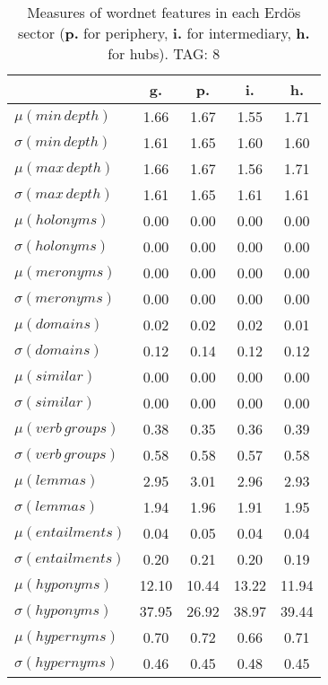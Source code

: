 \begin{table}[h!]
\begin{center}
\begin{tabular}{| l || c | c | c | c |}\hline
 & {\bf g.} & {\bf p.} & {\bf i.} & {\bf h.} \\\hline\hline
$\mu(min\,depth)$ & 1.66  & 1.67  & 1.55  & 1.71 \\
$\sigma(min\,depth)$ & 1.61  & 1.65  & 1.60  & 1.60 \\\hline
$\mu(max\,depth)$ & 1.66  & 1.67  & 1.56  & 1.71 \\
$\sigma(max\,depth)$ & 1.61  & 1.65  & 1.61  & 1.61 \\\hline
$\mu(holonyms)$ & 0.00  & 0.00  & 0.00  & 0.00 \\
$\sigma(holonyms)$ & 0.00  & 0.00  & 0.00  & 0.00 \\\hline
$\mu(meronyms)$ & 0.00  & 0.00  & 0.00  & 0.00 \\
$\sigma(meronyms)$ & 0.00  & 0.00  & 0.00  & 0.00 \\\hline
$\mu(domains)$ & 0.02  & 0.02  & 0.02  & 0.01 \\
$\sigma(domains)$ & 0.12  & 0.14  & 0.12  & 0.12 \\\hline
$\mu(similar)$ & 0.00  & 0.00  & 0.00  & 0.00 \\
$\sigma(similar)$ & 0.00  & 0.00  & 0.00  & 0.00 \\\hline
$\mu(verb\,groups)$ & 0.38  & 0.35  & 0.36  & 0.39 \\
$\sigma(verb\,groups)$ & 0.58  & 0.58  & 0.57  & 0.58 \\\hline
$\mu(lemmas)$ & 2.95  & 3.01  & 2.96  & 2.93 \\
$\sigma(lemmas)$ & 1.94  & 1.96  & 1.91  & 1.95 \\\hline
$\mu(entailments)$ & 0.04  & 0.05  & 0.04  & 0.04 \\
$\sigma(entailments)$ & 0.20  & 0.21  & 0.20  & 0.19 \\\hline
$\mu(hyponyms)$ & 12.10  & 10.44  & 13.22  & 11.94 \\
$\sigma(hyponyms)$ & 37.95  & 26.92  & 38.97  & 39.44 \\\hline
$\mu(hypernyms)$ & 0.70  & 0.72  & 0.66  & 0.71 \\
$\sigma(hypernyms)$ & 0.46  & 0.45  & 0.48  & 0.45 \\\hline
\end{tabular}
\caption{Measures of wordnet features in each Erd\"os sector ({{\bf p.}} for periphery, {{\bf i.}} for intermediary, {{\bf h.}} for hubs). TAG: 8}
\end{center}
\end{table}